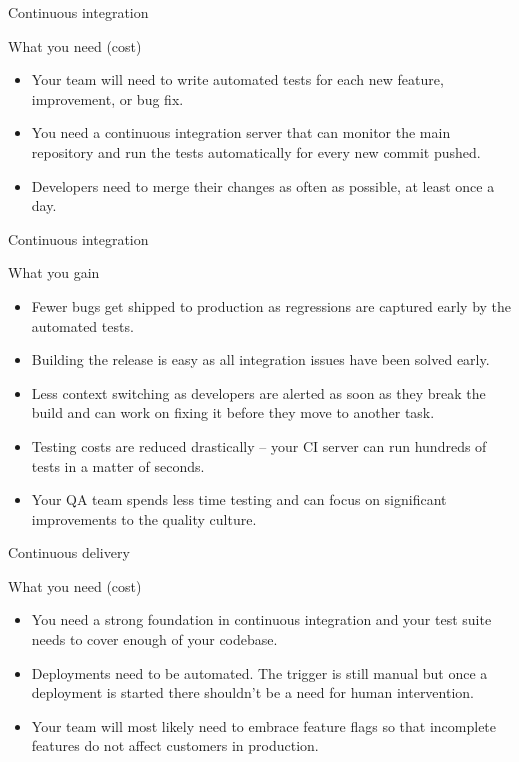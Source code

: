 \documentclass{beamer}
\begin{document}
\begin{frame}{Continuous integration}

\begin{block}{What you need (cost)}
	\begin{itemize}
		\item Your team will need to write automated tests for each new feature, improvement, or bug fix.
		\item You need a continuous integration server that can monitor the main repository and run the tests automatically for every new commit pushed.
		\item Developers need to merge their changes as often as possible, at least once a day.
	\end{itemize}
\end{block}
\end{frame}

\begin{frame}{Continuous integration}
	\begin{block}{What you gain}
	\begin{itemize}
		\item Fewer bugs get shipped to production as regressions are captured early by the automated tests.
		\item Building the release is easy as all integration issues have been solved early.
		\item Less context switching as developers are alerted as soon as they break the build and can work on fixing it before they move to another task.
		\item Testing costs are reduced drastically – your CI server can run hundreds of tests in a matter of seconds.
		\item Your QA team spends less time testing and can focus on significant improvements to the quality culture.
	\end{itemize}
	\end{block}
\end{frame}

\begin{frame}{Continuous delivery}
	\begin{block}{What you need (cost)}
		\begin{itemize}
			\item You need a strong foundation in continuous integration and your test suite needs to cover enough of your codebase.
			\item Deployments need to be automated. The trigger is still manual but once a deployment is started there shouldn't be a need for human intervention.
			\item Your team will most likely need to embrace feature flags so that incomplete features do not affect customers in production.
		\end{itemize}
	\end{block}
\end{frame}
\end{document}
